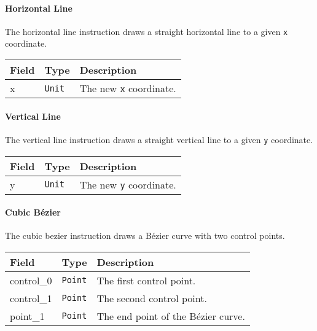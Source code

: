 \documentclass[]{article}
\begin{document}
\hypertarget{horizontal-line}{\paragraph{Horizontal Line}\label{horizontal-line}}

The horizontal line instruction draws a straight horizontal line to a
given \texttt{x} coordinate.

\begin{longtable}[]{@{}p{1in}p{0.5in}p{4.5in}@{}}
\toprule
Field & Type & Description \\
\midrule
\endhead
x & \texttt{Unit} & The new \texttt{x} coordinate. \\
\bottomrule
\end{longtable}

\hypertarget{vertical-line}{\paragraph{Vertical Line}\label{vertical-line}}

The vertical line instruction draws a straight vertical line to a given
\texttt{y} coordinate.

\begin{longtable}[]{@{}p{1in}p{0.5in}p{4.5in}@{}}
\toprule
Field & Type & Description \\
\midrule
\endhead
y & \texttt{Unit} & The new \texttt{y} coordinate. \\
\bottomrule
\end{longtable}

\hypertarget{cubic-bezier}{%
\paragraph{Cubic Bézier}\label{cubic-bezier}}

The cubic bezier instruction draws a Bézier curve with two control
points.

\begin{longtable}[]{@{}p{1in}p{0.5in}p{4.5in}@{}}
\toprule
Field & Type & Description \\
\midrule
\endhead
control\_0 & \texttt{Point} & The first control point. \\
control\_1 & \texttt{Point} & The second control point. \\
point\_1 & \texttt{Point} & The end point of the Bézier curve. \\
\bottomrule
\end{longtable}
\end{document}
